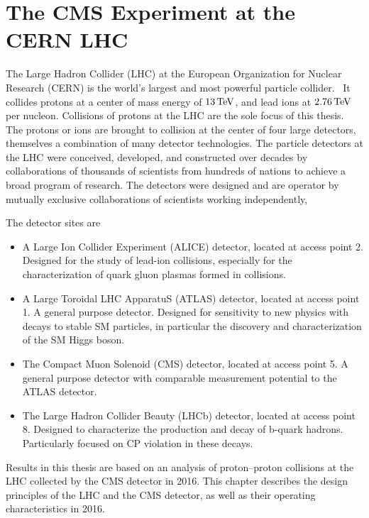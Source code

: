 \chapter{The CMS Experiment at the CERN LHC}

The Large Hadron Collider (LHC) at the European Organization for Nuclear Research (CERN)
is the world's largest and most powerful particle collider.~\cite{Evans:2008zzb} It collides protons 
at a center of mass energy of $13\,\text{Te\hspace{-.08em}V}$, and lead ions at $2.76\,\text{Te\hspace{-.08em}V}$ per nucleon.
Collisions of protons at the LHC are the sole focus of this thesis. 
The protons or ions are brought to collision at the center of four large detectors,
themselves a combination of many detector technologies. 
The particle detectors at the LHC were conceived, developed, and constructed over decades
by collaborations of thousands of scientists from hundreds of nations to
achieve a broad program of research. The detectors were designed and are operator 
by mutually exclusive collaborations of scientists working independently,

The detector sites are

\begin{itemize}
  \item A Large Ion Collider Experiment (ALICE) detector, located at access point 2.
  Designed for the study of lead-ion collisions, especially for the characterization
    of quark gluon plasmas formed in collisions.~\cite{Aamodt:2008zz}
  \item A Large Toroidal LHC ApparatuS (ATLAS) detector, located at access point 1.
  A general purpose detector. Designed for sensitivity to new physics
  with decays to stable SM particles, in particular the 
    discovery and characterization of the SM Higgs boson.~\cite{Aad:2008zzm}
  \item The Compact Muon Solenoid (CMS) detector, located at access point 5.
    A general purpose detector with comparable measurement potential to the ATLAS detector.~\cite{Chatrchyan:2008aa}
  \item The Large Hadron Collider Beauty (LHCb) detector, located at access point 8.
  Designed to characterize the production and decay of b-quark hadrons. Particularly
    focused on CP violation in these decays.~\cite{Alves:2008zz}
\end{itemize}

Results in this thesis are based on an analysis of proton--proton collisions at the LHC 
collected by the CMS detector in 2016. This chapter describes the design principles of the 
LHC and the CMS detector, as well as their operating characteristics in 2016.
  
